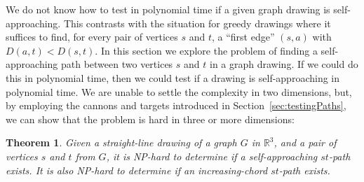 \documentclass[11pt]{article}
\newtheorem{theorem}{Theorem}
\newcommand{\changed}[1]{#1}
\begin{document}
{\changed We do not know how to test in polynomial time if a given graph drawing is self-approaching.
This contrasts with the situation for greedy drawings where it suffices to find, for every pair of vertices $s$ and $t$, a ``first edge'' $(s,a)$ with $D(a,t) < D(s,t)$.
In this section we explore the problem of finding a self-approaching path between two vertices $s$ and $t$ in a graph drawing.  If we could do this in polynomial time, then we could test if a drawing is self-approaching in polynomial time.
We are unable to settle the complexity in two dimensions, but,  by employing the cannons and targets introduced in Section~\ref{sec:testingPaths}, we can show that the problem is hard in three or more dimensions:}



\begin{theorem}
\label{thm:SAPathsInGraphs}
Given a straight-line drawing of a graph $G$ in $\mathbb{R}^3$, and a pair of vertices $s$ and $t$ from $G$, it is NP-hard to determine if a self-approaching $st$-path exists. It is also NP-hard to determine if an increasing-chord $st$-path exists.
\end{theorem}
\end{document}
